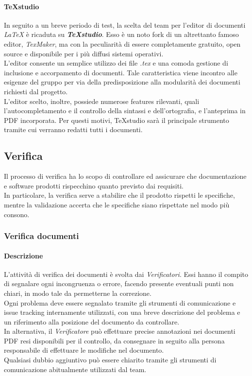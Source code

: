 		\paragraph{TeXstudio}
		In seguito a un breve periodo di test, la scelta del team per l'editor di documenti \textit{\LaTeX{}} è ricaduta su \textit{\textbf{TeXstudio}}. Esso è un noto fork di un altrettanto famoso editor, \textit{TexMaker}, ma con la peculiarità di essere completamente gratuito, open source e disponibile per i più diffusi sistemi operativi.\\ L'editor consente un semplice utilizzo dei file \textit{.tex} e una comoda gestione di inclusione e accorpamento di documenti. Tale caratteristica viene incontro alle esigenze del gruppo per via della predisposizione alla modularità dei documenti richiesti dal progetto.\\
		L'editor scelto, inoltre, possiede numerose features rilevanti, quali l'autocompletamento e il controllo della sintassi e dell'ortografia, e l'anteprima in PDF incorporata. Per questi motivi, TeXstudio sarà il principale strumento tramite cui verranno redatti tutti i documenti.
	
	\newpage
	\subsection{Verifica}
	Il processo di verifica ha lo scopo di controllare ed assicurare che documentazione e software prodotti rispecchino quanto previsto dai requisiti.\\
	In particolare, la verifica serve a stabilire che il prodotto rispetti le specifiche, mentre la validazione accerta che le specifiche siano rispettate nel modo più consono.

		\subsubsection{Verifica documenti}
		
		\paragraph{Descrizione}
		L'attività di verifica dei documenti è svolta dai \textit{Verificatori}. Essi hanno il compito di segnalare ogni incongruenza o errore, facendo presente eventuali punti non chiari, in modo tale da permetterne la correzione.\\
		Ogni problema deve essere segnalato tramite gli strumenti di comunicazione e issue tracking internamente utilizzati, con una breve descrizione del problema e un riferimento alla posizione del documento da controllare.\\
		In alternativa, il \textit{Verificatore} può effettuare precise annotazioni nei documenti PDF resi disponibili per il controllo, da consegnare in seguito alla persona responsabile di effettuare le modifiche nel documento.\\
		Qualsiasi dubbio aggiuntivo può essere chiarito tramite gli strumenti di comunicazione abitualmente utilizzati dal team.
		
